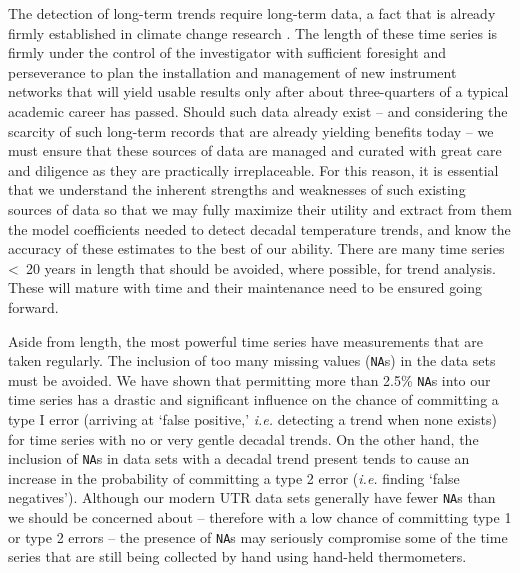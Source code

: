 \documentclass[]{ametsoc}
\begin{document}
The detection of long-term trends require long-term data, a fact that is already firmly established in climate change research \citep{Ohring2005,IPCC2013}. The length of these time series is firmly under the control of the investigator with sufficient foresight and perseverance to plan the installation and management of new instrument networks that will yield usable results only after about three-quarters of a typical academic career has passed. Should such data already exist -- and considering the scarcity of such long-term records that are already yielding benefits today -- we must ensure that these sources of data are managed and curated with great care and diligence as they are practically irreplaceable. For this reason, it is essential that we understand the inherent strengths and weaknesses of such existing sources of data so that we may fully maximize their utility and extract from them the model coefficients needed to detect decadal temperature trends, and know the accuracy of these estimates to the best of our ability. There are many time series \textless~20 years in length that should be avoided, where possible, for trend analysis. These will mature with time and their maintenance need to be ensured going forward.

Aside from length, the most powerful time series have measurements that are taken regularly. The inclusion of too many missing values (\texttt{NA}s) in the data sets must be avoided. We have shown that permitting more than 2.5\% \texttt{NA}s into our time series has a drastic and significant influence on the chance of committing a type I error (arriving at `false positive,' \emph{i.e.} detecting a trend when none exists) for time series with no or very gentle decadal trends. On the other hand, the inclusion of \texttt{NA}s in data sets with a decadal trend present tends to cause an increase in the probability of committing a type 2 error (\emph{i.e.} finding `false negatives'). Although our modern UTR data sets generally have fewer \texttt{NA}s than we should be concerned about -- therefore with a low chance of committing type 1 or type 2 errors -- the presence of \texttt{NA}s may seriously compromise some of the time series that are still being collected by hand using hand-held thermometers.
\end{document}
